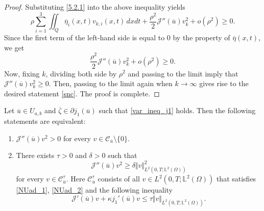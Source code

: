 \documentclass[reqno]{amsart}
\begin{document}
\begin{proof}
		Substituting \eqref{5.2.1} into the above inequality yields
		\begin{equation*}
			\rho \sum_{i=1}^3 \iint_Q \overline{\eta}_i(x,t) v_{k,i}(x,t) \, dxdt + \frac{\rho^2}{2} \mathcal{J}''(\overline{u})v_k^2 + o(\rho^2) \geq 0.
		\end{equation*}
		Since the first term of the left-hand side is equal to $0$ by the property of $\overline{\eta}(x,t)$, we get
		\begin{equation*}
			\frac{\rho^2}{2} \mathcal{J}''(\overline{u})v_k^2 + o(\rho^2) \geq 0.
		\end{equation*}
		Now, fixing $k$, dividing both side by $\rho^2$ and passing to the limit imply that $\mathcal{J}''(\overline{u})v_k^2 \geq 0$. Then, passing to the limit again when $k\rightarrow \infty $ gives rise to the desired statement \eqref{snc}. The proof is complete.
	\end{proof}
	\begin{theorem} \label{theo_ssc}
		Let $\overline{u} \in U_{a, b}$ and $\overline{\zeta}\in \partial j_1(\overline{u})$ such that \eqref{var_ineq_j1} holds. Then the following statements are equivalent:
		\begin{enumerate}
			\item $\mathcal{J}''(\overline{u})v^2 > 0$ for every $v\in \mathcal{C}_{\overline{u}} \setminus \{0 \}. $\\
			\item There exists $\tau>0$ and $\delta>0$ such that
			\begin{equation*}
				\mathcal{J}''(\overline{u})v^2 \geq \delta \Vert v \Vert^2 _{L^2(0,T;\mathbb{L}^2(\Omega))}
			\end{equation*}
			for every $v \in \mathcal{C}^\tau_{\overline{u}}$. Here $\mathcal{C}_{\overline{u}}^\tau$ consists of all $v \in L^2(0,T;\mathbb{L}^2(\Omega))$ that satisfies \eqref{NUad_1}, \eqref{NUad_2} and the following inequality
			\begin{equation*}
				\mathcal{J}'(\overline{u})v + \kappa j_1'(\overline{u})v \leq \tau \Vert v \Vert_{L^2(0,T;\mathbb{L}^2(\Omega))}.
			\end{equation*}
		\end{enumerate} 
	\end{theorem}
	
\end{document}
